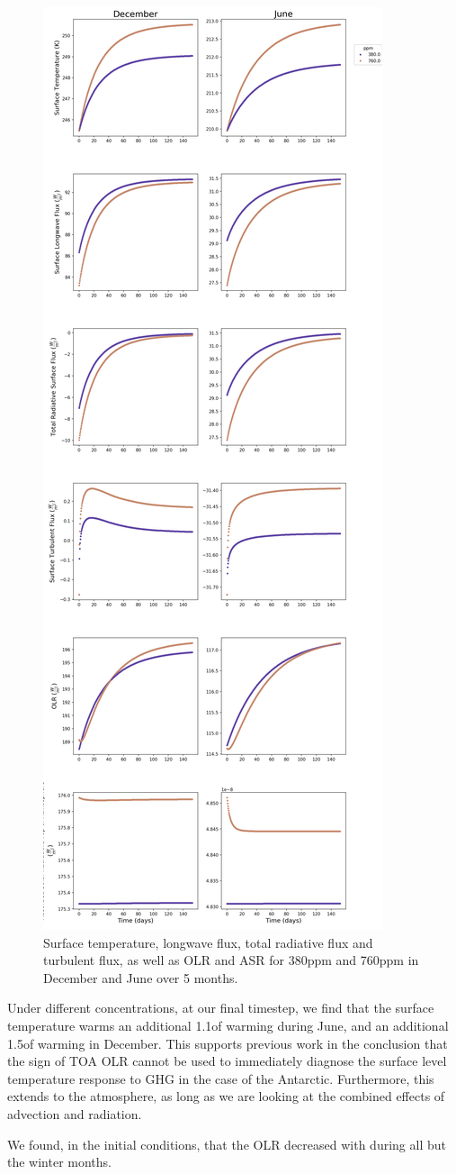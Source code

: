 \documentclass[12]{article}
\begin{document}
\begin{figure}[htb!]
\noindent\includegraphics[width=.5\textwidth]{figures/surface_processes.png}
\centering
\caption{Surface temperature, longwave flux, total radiative flux and turbulent flux, as well as OLR and ASR for 380ppm and 760ppm in December and June over 5 months.}
\label{fig:sfc_timestep}
\end{figure}


Under different  concentrations, at our final timestep, we find that the surface temperature warms an additional 1.1\degree of warming during June, and an additional 1.5\degree of warming in December. This supports previous work in the conclusion that the sign of TOA OLR cannot be used to immediately diagnose the surface level temperature response to GHG in the case of the Antarctic. Furthermore, this extends to the atmosphere, as long as we are looking at the combined effects of advection and radiation.

We found, in the initial conditions, that the OLR decreased with  during all but the winter months. 

\pagebreak


\end{document}
